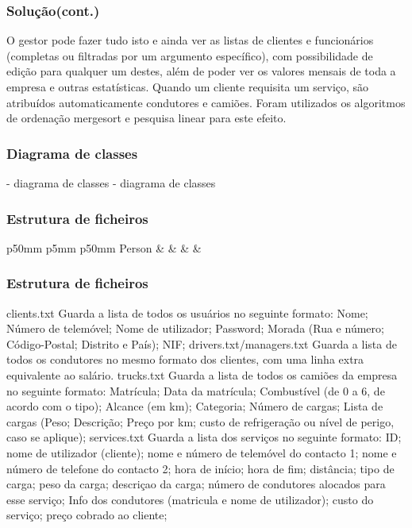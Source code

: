 \documentclass{beamer}
\def\\{}
\begin{document}
\begin{frame}
\frametitle{Solução(cont.)}

O gestor pode fazer tudo isto e ainda ver as listas de clientes e funcionários (completas ou filtradas por um argumento específico), com possibilidade de edição para qualquer um destes, além de poder ver os valores mensais de toda a empresa e outras estatísticas.\\
Quando um cliente requisita um serviço, são atribuídos automaticamente condutores e camiões.
Foram utilizados os algoritmos de ordenação mergesort e pesquisa linear para este efeito.
\end{frame}

\begin{frame}
\frametitle{Diagrama de classes}


- diagrama de classes
- diagrama de classes
\end{frame}

\begin{frame}
\frametitle{Estrutura de ficheiros}
\begin{tabular}{p{50mm} p{5mm} p{50mm}}
	Person & & \\	
	{\tiny  } & &
\end{tabular}
\end{frame}

\begin{frame}
\frametitle{Estrutura de ficheiros}
clients.txt\\
Guarda a lista de todos os usuários no seguinte formato: Nome; Número de telemóvel; Nome de utilizador; Password; Morada (Rua e número; Código-Postal; Distrito e País); NIF;\\
drivers.txt/managers.txt\\
Guarda a lista de todos os condutores no mesmo formato dos clientes, com uma linha extra equivalente ao salário.
trucks.txt\\
Guarda a lista de todos os camiões da empresa no seguinte formato: Matrícula; Data da matrícula; Combustível (de 0 a 6, de acordo com o tipo); Alcance (em km); Categoria; Número de cargas; Lista de cargas (Peso; Descrição; Preço por km; custo de refrigeração ou nível de perigo, caso se aplique);\\
services.txt\\
Guarda a lista dos serviços no seguinte formato: ID; nome de utilizador (cliente); nome e número de telemóvel do contacto 1; nome e número de telefone do contacto 2; hora de início; hora de fim; distância; tipo de carga; peso da carga; descriçao da carga; número de condutores alocados para esse serviço; Info dos condutores (matricula e nome de utilizador); custo do serviço; preço cobrado ao cliente;
\end{frame}
 
\end{document}
